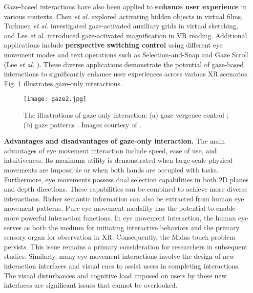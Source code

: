 \documentclass[review]{fcs}
\newcommand{\revise}[2]{\textcolor[rgb]{0,0,0}{#2}}
\begin{document}
Gaze-based interactions have also been applied to \textbf{enhance user experience} in various contexts.
\revise{Chen \textit{et al.} explored activating hidden objects in virtual films \cite{DBLP:conf/ismar/ChenHTHH23}, Turkmen \textit{et al.} investigated gaze-activated auxiliary grids in virtual sketching \cite{DBLP:conf/chi/TurkmenGBSASPM24}, and Lee \textit{et al.} introduced gaze-activated magnification in VR reading \cite{DBLP:conf/ismar/LeeHM22}.}{Chen \textit{et al.} \cite{DBLP:conf/ismar/ChenHTHH23} explored activating hidden objects in virtual films, Turkmen \textit{et al.} \cite{DBLP:conf/chi/TurkmenGBSASPM24} investigated gaze-activated auxiliary grids in virtual sketching, and Lee \textit{et al.} \cite{DBLP:conf/ismar/LeeHM22} introduced gaze-activated magnification in VR reading.}
Additional applications include \textbf{perspective switching control} using different eye movement modes\cite{DBLP:conf/chi/LeeWSG24} and text operations such as Selection-and-Snap and Gaze Scroll (Lee \textit{et al.} \cite{DBLP:conf/ismar/LeeHM22}). These diverse applications demonstrate the potential of gaze-based interactions to significantly enhance user experiences across various XR scenarios. \revise{}{Fig. \ref{Gaze} illustrates gaze-only interactions.}

\begin{figure}[t]
    \centering
    \texttt{[image: gaze2.jpg]}
    \caption{\revise{}{The illustrations of gaze only interaction: (a) gaze vergence control \cite{DBLP:journals/tvcg/WangZ022}; (b) gaze patterns \cite{wang2024tasks}. Images courtesy of \cite{DBLP:journals/tvcg/WangZ022, wang2024tasks}}.}
    \label{Gaze}
\end{figure}

\textbf{Advantages and disadvantages of gaze-only interaction.}
The main advantages of eye movement interaction include speed, ease of use, and intuitiveness. Its maximum utility is demonstrated when large-scale physical movements are impossible or when both hands are occupied with tasks. Furthermore, eye movements possess dual selection capabilities in both 2D planes and depth directions. These capabilities can be combined to achieve more diverse interactions. Richer semantic information can also be extracted from human eye movement patterns. Pure eye movement modality has the potential to enable more powerful interaction functions.
In eye movement interaction, the human eye serves as both the medium for initiating interactive behaviors and the primary sensory organ for observation in XR. Consequently, the Midas touch problem persists. This issue remains a primary consideration for researchers in subsequent studies. Similarly, many eye movement interactions involve the design of new interaction interfaces and visual cues to assist users in completing interactions. The visual disturbances and cognitive load imposed on users by these new interfaces are significant issues that cannot be overlooked.
\end{document}
